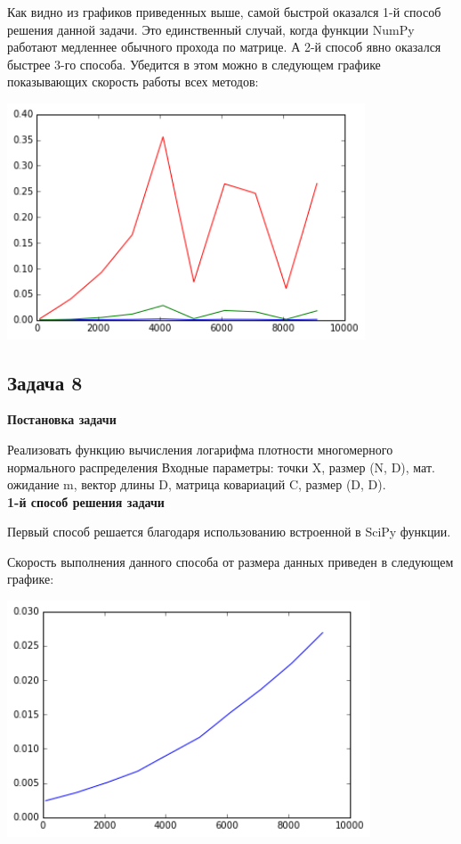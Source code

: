 \documentclass[12pt, a4paper]{article}
\begin{document}
				Как видно из графиков приведенных выше, самой быстрой оказался 1-й способ решения данной задачи. Это единственный случай, когда функции NumPy работают медленнее обычного прохода по матрице. А 2-й способ явно оказался быстрее 3-го способа. Убедится в этом можно в следующем графике показывающих скорость работы всех методов:
				\begin{center}
					\includegraphics[height=7cm]{timeit/num7_ti123.png}
				\end{center}



		\newpage
		\subsection{Задача 8}

			{\bf Постановка задачи\\}

				Реализовать функцию вычисления логарифма плотности многомерного нормального распределения Входные параметры: точки X, размер (N, D), мат. ожидание m, вектор длины D, матрица ковариаций C, размер (D, D). \\

			{\bf 1-й способ решения задачи\\}

				Первый способ решается благодаря использованию встроенной в SciPy функции.

				Скорость выполнения данного способа от размера данных приведен в следующем графике:
				\begin{center}
					\includegraphics[height=7cm]{timeit/num8_ti1.png}
				\end{center}
\end{document}
